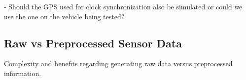 - Should the GPS used for clock synchronization also be simulated or could we use the one on the vehicle being tested?



\subsection{Raw vs Preprocessed Sensor Data}
Complexity and benefits regarding generating raw data versus preprocessed information.







